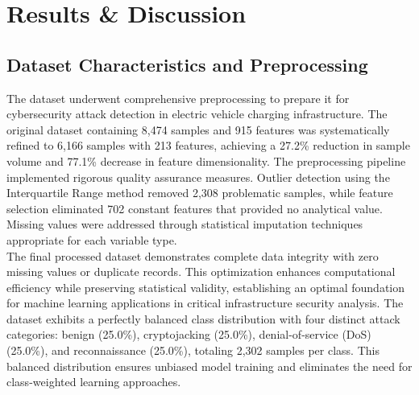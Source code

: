 \section{Results \& Discussion}
\label{label:results-discussion}

\subsection{Dataset Characteristics and Preprocessing}
The dataset underwent comprehensive preprocessing to prepare it for cybersecurity attack detection in electric vehicle charging infrastructure. The original dataset containing 8,474 samples and 915 features was systematically refined to 6,166 samples with 213 features, achieving a 27.2\% reduction in sample volume and 77.1\% decrease in feature dimensionality. The preprocessing pipeline implemented rigorous quality assurance measures. Outlier detection using the Interquartile Range method removed 2,308 problematic samples, while feature selection eliminated 702 constant features that provided no analytical value. Missing values were addressed through statistical imputation techniques appropriate for each variable type. \\

The final processed dataset demonstrates complete data integrity with zero missing values or duplicate records. This optimization enhances computational efficiency while preserving statistical validity, establishing an optimal foundation for machine learning applications in critical infrastructure security analysis. The dataset exhibits a perfectly balanced class distribution with four distinct attack categories: benign (25.0\%), cryptojacking (25.0\%), denial-of-service (DoS) (25.0\%), and reconnaissance (25.0\%), totaling 2,302 samples per class. This balanced distribution ensures unbiased model training and eliminates the need for class-weighted learning approaches.


